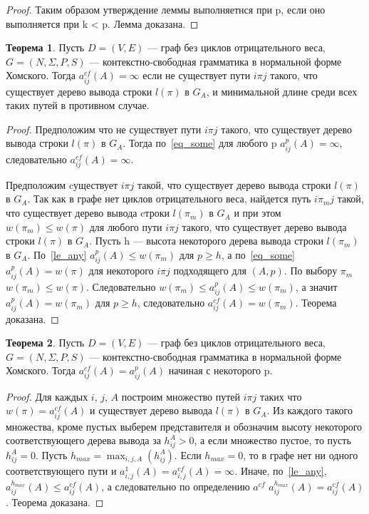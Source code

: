 \documentclass[14pt]{matmex-diploma}
\theoremstyle{definition}
\newtheorem{theorem}{Теорема}
\begin{document}
\begin{proof}
            Таким образом утверждение леммы выполняетнся при p, если оно выполняется при k < p. Лемма доказана.            
       \end{proof}
        
        \begin{theorem}
        \label{th_correctness}
            Пусть $D=(V,E)$ --- граф без циклов отрицательного веса, $G=(N,\Sigma, P, S)$ --- контекстно-свободная грамматика в нормальной форме Хомского. Тогда $a^{cf}_{ij}(A) = \infty$ если не существует пути $i\pi j$ такого, что существует дерево вывода строки $l(\pi)$ в $G_A$, и минимальной длине среди всех таких путей в противном случае.
        \end{theorem}
        \begin{proof}
            Предположим что не существует пути $i\pi j$ такого, что существует дерево вывода строки $l(\pi)$ в $G_A$. Тогда по~\cref{eq_some} для любого p $a^p_{ij}(A) = \infty$, следовательно $a^{cf}_{ij}(A) = \infty$.
            
            Предположим cуществует $i\pi j$ такой, что существует дерево вывода строки $l(\pi)$ в $G_A$. Так как в графе нет циклов отрицательного веса, найдется путь $i\pi_m j$ такой, что существует дерево вывода cтроки $l(\pi_m)$ в $G_A$ и при этом $w(\pi_m) \le w(\pi)$ для любого пути $i\pi j$ такого, что существует дерево вывода строки $l(\pi)$ в $G_A$. Пусть h --- высота некоторого дерева вывода строки $l(\pi_m)$ в $G_A$. По~\cref{le_any} $a^p_{ij}(A) \le w(\pi_m)$ для $p \ge h$, а по~\cref{eq_some} $a^p_{ij}(A) = w(\pi)$ для некоторого $i\pi j$ подходящего для $(A, p)$. По выбору $\pi_m$
         $w(\pi_m) \le w(\pi)$. Следовательно $w(\pi_m) \le a^p_{ij}(A) \le w(\pi_m)$, а значит $a^p_{ij}(A) = w(\pi_m)$ для $p \ge h$, следовательно $a^{cf}_{ij}(A) = w(\pi_m)$. Теорема доказана.
        \end{proof}
        
        \begin{theorem}
        \label{th_finiteness}
            Пусть $D=(V,E)$ --- граф без циклов отрицательного веса, $G=(N,\Sigma, P, S)$ --- контекстно-свободная грамматика в нормальной форме Хомского. Тогда $a^{cf}_{ij}(A) = a^p_{ij}(A)$ начиная с некоторого p.
        \end{theorem}
        \begin{proof}
            Для каждых $i$, $j$, $A$ построим множество путей $i\pi j$ таких что $w(\pi) = a^{cf}_{ij}(A)$ и существует дерево вывода $l(\pi)$ в $G_A$. Из каждого такого множества, кроме пустых выберем представителя и обозначим высоту некоторого соответствующего дерева вывода за $h^A_{ij} > 0$, а если множество пустое, то пусть $h^A_{ij} = 0$. Пусть $h_{max} = \max_{i, j, A}(h^A_{ij})$. Если $h_{max} = 0$, то в графе нет ни одного соответствующего пути и $a^1_{i,j}(A) = a^{cf}_{i,j}(A) = \infty$. Иначе, по~\cref{le_any}, $a^{h_{max}}_{ij}(A) \le a^{cf}_{ij}(A)$, а следовательно по определению $a^{cf}$ $a^{h_{max}}_{ij}(A) = a^{cf}_{ij}(A)$. Теорема доказана.     
        \end{proof}
\end{document}
